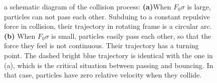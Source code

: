 \documentclass[aps,preprintnumbers,onecolumn,amsmath,amssymb,floatfix,pra]{revtex4-1}
\begin{document}
\begin{figure}[h
]
\caption{a schematic diagram of the collision process: \textbf{(a)}When $F_0\sigma$ is large, particles can not pass each other. Subduing to a constant repulsive force in collision, their trajectory in rotating frame is a circular arc.  \textbf{(b)} When $F_0\sigma$ is small, particles easily pass each other, so that the force they feel is not continuous. Their trajectory has a turning point. The dashed bright blue trajectory is identical with the one in (a), which is the critical situation between passing and bouncing. In that case, particles have zero relative velocity when they collide. }
\label{fig:Breathingfrequency3}
\end{figure}
\end{document}
